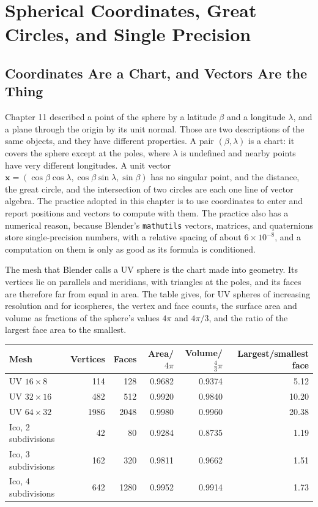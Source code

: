 \chapter{Spherical Coordinates, Great Circles, and Single Precision}

\section{Coordinates Are a Chart, and Vectors Are the Thing}

Chapter 11 described a point of the sphere by a latitude $\beta$ and a longitude $\lambda$, and a plane through the origin by its unit normal. Those are two descriptions of the same objects, and they have different properties. A pair $(\beta,\lambda)$ is a chart: it covers the sphere except at the poles, where $\lambda$ is undefined and nearby points have very different longitudes. A unit vector $\mathbf x=(\cos\beta\cos\lambda,\cos\beta\sin\lambda,\sin\beta)$ has no singular point, and the distance, the great circle, and the intersection of two circles are each one line of vector algebra. The practice adopted in this chapter is to use coordinates to enter and report positions and vectors to compute with them. The practice also has a numerical reason, because Blender's \texttt{mathutils} vectors, matrices, and quaternions store single-precision numbers, with a relative spacing of about $6\times10^{-8}$, and a computation on them is only as good as its formula is conditioned.

The mesh that Blender calls a UV sphere is the chart made into geometry. Its vertices lie on parallels and meridians, with triangles at the poles, and its faces are therefore far from equal in area. The table gives, for UV spheres of increasing resolution and for icospheres, the vertex and face counts, the surface area and volume as fractions of the sphere's values $4\pi$ and $4\pi/3$, and the ratio of the largest face area to the smallest.

\begin{center}
\begin{tabular}{lrrrrr}
\toprule
Mesh & Vertices & Faces & Area/$4\pi$ & Volume/$\tfrac43\pi$ & Largest/smallest face\\
\midrule
UV $16\times8$ & 114 & 128 & 0.9682 & 0.9374 & 5.12\\
UV $32\times16$ & 482 & 512 & 0.9920 & 0.9840 & 10.20\\
UV $64\times32$ & 1986 & 2048 & 0.9980 & 0.9960 & 20.38\\
Ico, 2 subdivisions & 42 & 80 & 0.9284 & 0.8735 & 1.19\\
Ico, 3 subdivisions & 162 & 320 & 0.9811 & 0.9662 & 1.51\\
Ico, 4 subdivisions & 642 & 1280 & 0.9952 & 0.9914 & 1.73\\
\bottomrule
\end{tabular}
\end{center}

